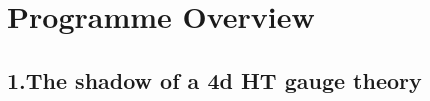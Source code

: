 %
%
%
%

\providecommand{\ChirHoch}{\operatorname{ChirHoch}}
\providecommand{\ChirAlg}{\operatorname{ChirAlg}}
\providecommand{\HTQFT}{\operatorname{HT\text{-}QFT}}
\providecommand{\Phihol}{\Phi_{\mathrm{hol}}}
\providecommand{\Face}{\operatorname{Face}}
\providecommand{\GRTone}{\operatorname{GRT}_1}
\providecommand{\kcat}{\kappa_{\mathrm{cat}}}
\providecommand{\kch}{\kappa_{\mathrm{ch}}}
\providecommand{\kBKM}{\kappa_{\mathrm{BKM}}}
\providecommand{\kfib}{\kappa_{\mathrm{fiber}}}
\providecommand{\SCchtopan}{\mathsf{SC}^{\mathrm{ch,top,an}}}
\providecommand{\Bbarch}{\bar{B}^{\mathrm{ch}}}
\providecommand{\Omegach}{\Omega^{\mathrm{ch}}}
\providecommand{\Kosz}{\operatorname{Kosz}}

\chapter*{Programme Overview}
\label{ch:programme-overview-platonic}

\vspace{1em}

\section*{1.\quad The shadow of a 4d HT gauge theory}


